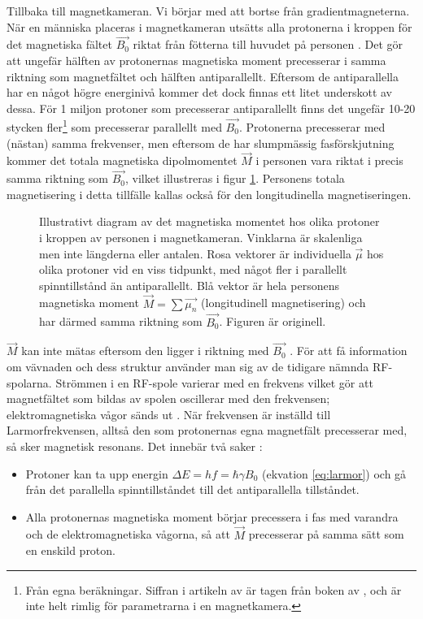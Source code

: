 \documentclass[11pt, a4paper]{article}
\begin{document}
Tillbaka till magnetkameran. Vi börjar med att bortse från gradientmagneterna. När en människa placeras i magnetkameran utsätts alla protonerna i kroppen för det magnetiska fältet $\vec{B_0}$ riktat från fötterna till huvudet på personen \parencite{understanding_mri}. Det gör att ungefär hälften av protonernas magnetiska moment precesserar i samma riktning som magnetfältet och hälften antiparallellt. Eftersom de antiparallella har en något högre energinivå kommer det dock finnas ett litet underskott av dessa. För 1 miljon protoner som precesserar antiparallellt finns det ungefär 10-20 stycken fler\footnote{Från egna beräkningar. Siffran i artikeln av \textcite{understanding_mri} är tagen från boken  av \textcite{mri_made_easy}, och är inte helt rimlig för parametrarna i en magnetkamera.} som precesserar parallellt med $\vec{B_0}$. Protonerna precesserar med (nästan) samma frekvenser, men eftersom de har slumpmässig fasförskjutning kommer det totala magnetiska dipolmomentet $\vec{M}$ i personen vara riktat i precis samma riktning som $\vec{B_0}$, vilket illustreras i figur \ref{fig:spinn_vektorer}. Personens totala magnetisering i detta tillfälle kallas också för den longitudinella magnetiseringen.

\begin{figure}[ht]
	\centering
	
	\caption{Illustrativt diagram av det magnetiska momentet hos olika protoner i kroppen av personen i magnetkameran. Vinklarna är skalenliga men inte längderna eller antalen. Rosa vektorer är individuella $\vec{\mu}$ hos olika protoner vid en viss tidpunkt, med något fler i parallellt spinntillstånd än antiparallellt. Blå vektor är hela personens magnetiska moment $\vec{M}=\sum{\vec{\mu_n}}$ (longitudinell magnetisering) och har därmed samma riktning som $\vec{B_0}$. Figuren är originell.}
	\label{fig:spinn_vektorer}
\end{figure}

$\vec{M}$ kan inte mätas eftersom den ligger i riktning med $\vec{B_0}$ \parencite{understanding_mri}. För att få information om vävnaden och dess struktur använder man sig av de tidigare nämnda RF-spolarna. Strömmen i en RF-spole varierar med en frekvens vilket gör att magnetfältet som bildas av spolen oscillerar med den frekvensen; elektromagnetiska vågor sänds ut \parencite{mri_for_radiologists}. När frekvensen är inställd till Larmorfrekvensen, alltså den som protonernas egna magnetfält precesserar med, så sker magnetisk resonans. Det innebär två saker \parencite{understanding_mri}:
\begin{itemize}
	\item Protoner kan ta upp energin $\Delta E=hf=\hbar\gamma B_0$ (ekvation \ref{eq:larmor}) och gå från det parallella spinntillståndet till det antiparallella tillståndet.
	\item Alla protonernas magnetiska moment börjar precessera i fas med varandra och de elektromagnetiska vågorna, så att $\vec{M}$ precesserar på samma sätt som en enskild proton.
\end{itemize}
\end{document}

